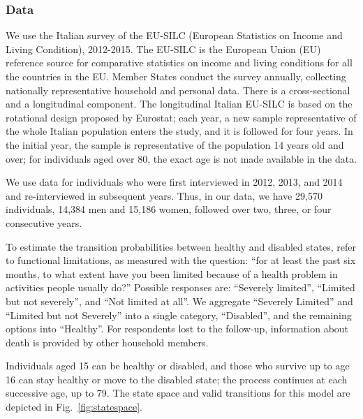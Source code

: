 \documentclass[a4paper,left=1.25cm,right=1.25cm,top=1.25cm,bottom=1.25cm]{article}
\begin{document}
\subsubsection{Data}
We use the Italian survey of the EU-SILC (European Statistics on Income and Living Condition), 2012-2015. The EU-SILC is the European Union (EU) reference source for comparative statistics on income and living conditions for all the countries in the EU. Member States conduct the survey annually, collecting nationally representative household and personal data. There is a cross-sectional and a longitudinal component. The longitudinal Italian EU-SILC is based on the rotational design proposed by Eurostat; each year, a new sample representative of the whole Italian population enters the study, and it is followed for four years. In the initial year, the sample is representative of the population 14 years old and over; for individuals aged over 80, the exact age is not made available in the data.

We use data for individuals who were first interviewed in 2012, 2013, and 2014 and re-interviewed in subsequent years. Thus, in our data, we have 29,570 individuals, 14,384 men and 15,186 women, followed over two, three, or four consecutive years.  

To estimate the transition probabilities between healthy and disabled states, refer to functional limitations, as measured with the question: ``for at least the past six months, to what extent have you been limited because of a health problem in activities people usually do?'' Possible responses are: ``Severely limited'', ``Limited but not severely'', and ``Not limited at all''. We aggregate ``Severely Limited'' and ``Limited but not Severely'' into a single category, ``Disabled'', and the remaining options into ``Healthy''. For respondents lost to the follow-up, information about death is provided by other household members.

Individuals aged 15 can be healthy or disabled, and those who survive up to age 16 can stay healthy or move to the disabled state; the process continues at each successive age, up to 79. The state space and valid transitions for this model are depicted in Fig.~\ref{fig:statespace}.
\end{document}
